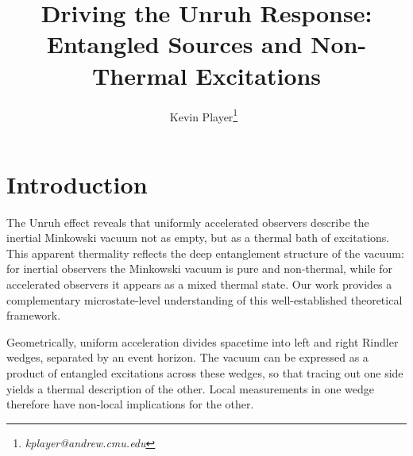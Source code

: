 \documentclass[12pt,a4paper]{article}
\begin{document}
\title{Driving the Unruh Response: Entangled Sources and Non-Thermal Excitations}
\author[ ]{Kevin Player\footnote{\textit{kplayer@andrew.cmu.edu}} \,}

\maketitle



\section{Introduction}

The Unruh effect \cite{unruh1976notes} reveals that uniformly accelerated observers describe the inertial Minkowski vacuum not as empty, but as a thermal bath of excitations. This apparent thermality reflects the deep entanglement structure of the vacuum: for inertial observers the Minkowski vacuum is pure and non-thermal, while for accelerated observers it appears as a mixed thermal state. Our work provides a complementary microstate-level understanding of this well-established theoretical framework.

Geometrically, uniform acceleration divides spacetime into left and right Rindler wedges, separated by an event horizon. The vacuum can be expressed as a product of entangled excitations across these wedges, so that tracing out one side yields a thermal description of the other. Local measurements in one wedge therefore have non-local implications for the other.
\end{document}

